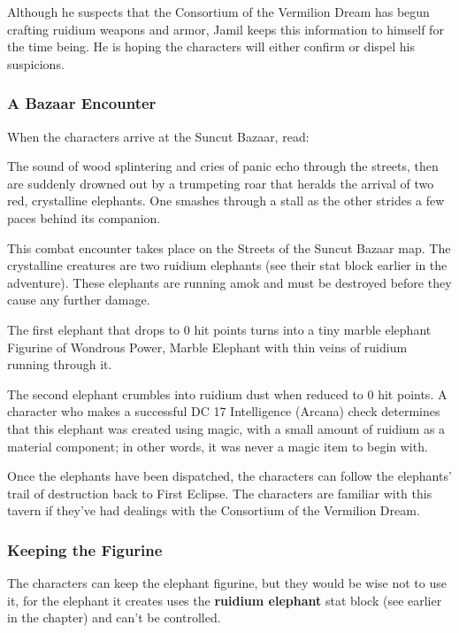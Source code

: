 \documentclass[10pt,a4paper,twoside,bg=print,twocolumn,openany,nodeprecatedcode]{dndbook}
\begin{document}
Although he suspects that the Consortium of the Vermilion Dream has begun crafting ruidium weapons and armor, Jamil keeps this information to himself for the time being. He is hoping the characters will either confirm or dispel his suspicions.

\subsubsection{A Bazaar Encounter}
When the characters arrive at the Suncut Bazaar, read:

\begin{DndReadAloud}{}
The sound of wood splintering and cries of panic echo through the streets, then are suddenly drowned out by a trumpeting roar that heralds the arrival of two red, crystalline elephants. One smashes through a stall as the other strides a few paces behind its companion.

\end{DndReadAloud}

This combat encounter takes place on the Streets of the Suncut Bazaar map. The crystalline creatures are two ruidium elephants (see their stat block earlier in the adventure). These elephants are running amok and must be destroyed before they cause any further damage.

The first elephant that drops to 0 hit points turns into a tiny marble elephant Figurine of Wondrous Power, Marble Elephant with thin veins of ruidium running through it.

The second elephant crumbles into ruidium dust when reduced to 0 hit points. A character who makes a successful DC 17 Intelligence (Arcana) check determines that this elephant was created using magic, with a small amount of ruidium as a material component; in other words, it was never a magic item to begin with.

Once the elephants have been dispatched, the characters can follow the elephants' trail of destruction back to First Eclipse. The characters are familiar with this tavern if they've had dealings with the Consortium of the Vermilion Dream.

\subsubsection{Keeping the Figurine}
The characters can keep the elephant figurine, but they would be wise not to use it, for the elephant it creates uses the \textbf{ruidium elephant} stat block (see earlier in the chapter) and can't be controlled.
\end{document}
